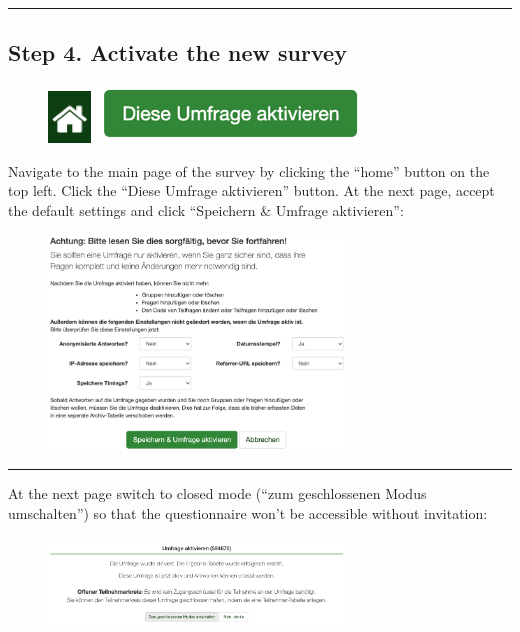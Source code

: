 \par\noindent\rule{\textwidth\color{pniblue}}{0.4pt}
\subsection*{Step 4. Activate the new survey}

\begin{figure}
\centering
\includegraphics{docs/fig/ls_sop4_home.png}
\includegraphics{docs/fig/ls_sop4_button.png}
\end{figure}

Navigate to the main page of the survey by clicking the “home” button on the top left. Click the “Diese Umfrage aktivieren” button. At the next page, accept the default settings and click “Speichern \& Umfrage aktivieren”:

\begin{figure}[H]
\includegraphics[width=0.7\textwidth]{docs/fig/ls_sop_4.png}
\end{figure}

\par\noindent\rule{\textwidth\color{pniblue}}{0.4pt}
At the next page switch to closed mode (“zum geschlossenen Modus umschalten”) so that the questionnaire won’t be accessible without invitation:

\begin{figure}[H]
\includegraphics[width=0.7\textwidth]{docs/fig/ls_sop4.1.png}
\end{figure}

